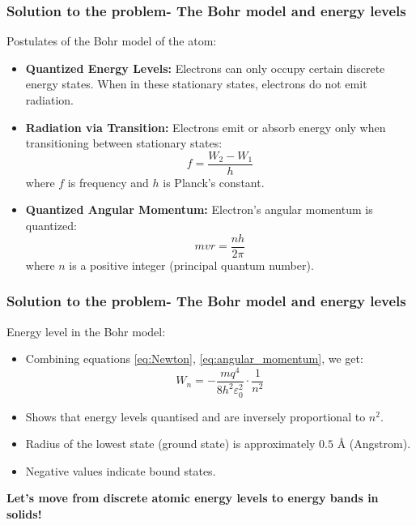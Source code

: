 \begin{frame}
	\frametitle{Solution to the problem- The Bohr model and energy levels}
    Postulates of the Bohr model of the atom:
    \begin{itemize}
        \item \textbf{Quantized Energy Levels:} Electrons can only occupy certain discrete energy states. When in these stationary states, electrons do not emit radiation.

        \item \textbf{Radiation via Transition:} Electrons emit or absorb energy only when transitioning between stationary states:
        \begin{equation}
        f = \frac{W_2 - W_1}{h}
        \end{equation}
        where $f$ is frequency and $h$ is Planck's constant.

        \item \textbf{Quantized Angular Momentum:} Electron's angular momentum is quantized:
        \begin{equation} \label{eq:angular_momentum}
        mvr = \frac{nh}{2\pi}
        \end{equation}
        where $n$ is a positive integer (principal quantum number).
    \end{itemize}
\end{frame}

\begin{frame}
	\frametitle{Solution to the problem- The Bohr model and energy levels}
    Energy level in the Bohr model:
    \begin{itemize}
        \item Combining equations \ref{eq:Newton}, \ref{eq:angular_momentum}, we get:
        \begin{equation}
        W_n = -\frac{m q^4}{8 h^2 \varepsilon_0^2} \cdot \frac{1}{n^2}
        \end{equation}
        \item Shows that energy levels quantised and are inversely proportional to $n^2$.
        \item Radius of the lowest state (ground state) is approximately $0.5$ Å (Angstrom).
        \item Negative values indicate bound states.
    \end{itemize}
\textbf{Let's move from discrete atomic energy levels to energy bands in solids!}
\end{frame}

